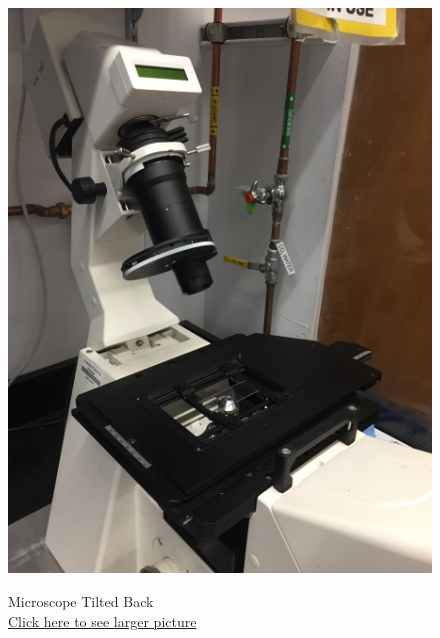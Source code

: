 \documentclass{../lab}
\begin{document}
\begin{figure}[H]
\captionsetup{justification=centering}
  \href{http://experimentationlab.berkeley.edu/sites/default/files/upimages/1_Tilt-Microscope_2542.JPG}{\includegraphics[width=\linewidth,keepaspectratio]{images/1_Tilt-Microscope_2542.JPG}}
  \caption{Microscope Tilted Back \\
  \href{http://experimentationlab.berkeley.edu/sites/default/files/upimages/1_Tilt-Microscope_2542.JPG}{Click here to see larger picture}}
  \label{fig:TiltMicroscope}
\endminipage \hfill
{}

\end{figure}
\end{document}
